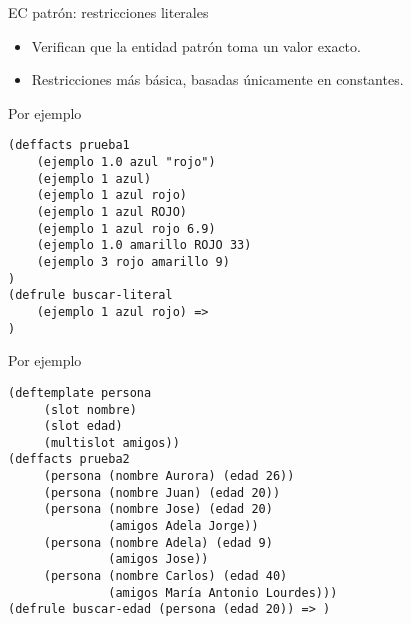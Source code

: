 \documentclass[usenames,dvipsnames,aspectratio=169]{beamer}
\begin{document}
\begin{frame}[fragile]{EC patrón: restricciones literales}
	\begin{itemize}
		\item Verifican que la entidad patrón toma un valor exacto.
		\item Restricciones más básica, basadas únicamente en constantes.
	\end{itemize}
	\begin{minipage}{.4\linewidth}
	\begin{exampleblock}{Por ejemplo}
		\footnotesize
		\begin{verbatim}
(deffacts prueba1
    (ejemplo 1.0 azul "rojo")
    (ejemplo 1 azul)
    (ejemplo 1 azul rojo)
    (ejemplo 1 azul ROJO)
    (ejemplo 1 azul rojo 6.9)
    (ejemplo 1.0 amarillo ROJO 33)
    (ejemplo 3 rojo amarillo 9)
)
(defrule buscar-literal
    (ejemplo 1 azul rojo) =>
)
		\end{verbatim}
	\end{exampleblock}
	\end{minipage}
	\hfill
	\begin{minipage}{.5\linewidth}
	\begin{exampleblock}{Por ejemplo}
		\footnotesize
		\begin{verbatim}
(deftemplate persona
     (slot nombre)
     (slot edad)
     (multislot amigos))
(deffacts prueba2
     (persona (nombre Aurora) (edad 26))
     (persona (nombre Juan) (edad 20))
     (persona (nombre Jose) (edad 20)
              (amigos Adela Jorge))
     (persona (nombre Adela) (edad 9)
              (amigos Jose))
     (persona (nombre Carlos) (edad 40)
              (amigos María Antonio Lourdes)))
(defrule buscar-edad (persona (edad 20)) => )
		\end{verbatim}
	\end{exampleblock}
\end{minipage}
\end{frame}
\end{document}
